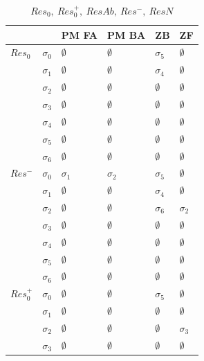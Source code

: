 \documentclass[11pt,a4paper]{article}
\begin{document}
    \begin{table}[]
\centering
\label{my-label}
\caption{$Res_0,~ Res_0^+,~ ResAb,~ Res^-,~ ResN$}
\begin{tabular}{|l|l|l|l|l|l|}
\hline
     &   & PM FA & PM BA & ZB & ZF \\ \hline
$Res_0$ & $\sigma_0$ &  $\emptyset$ & $\emptyset$ & $\sigma_5$ & $\emptyset$   \\ \hline
     & $\sigma_1$ &  $\emptyset$  & $\emptyset$ & $\sigma_4$   &  $\emptyset$  \\ \hline
     & $\sigma_2$ &  $\emptyset$  & $\emptyset$ & $\emptyset$   &  $\emptyset$  \\ \hline
     & $\sigma_3$ &  $\emptyset$  & $\emptyset$ & $\emptyset$   &  $\emptyset$  \\ \hline
     & $\sigma_4$ &  $\emptyset$  & $\emptyset$ & $\emptyset$   &  $\emptyset$  \\ \hline
     & $\sigma_5$ &  $\emptyset$  & $\emptyset$ & $\emptyset$   &  $\emptyset$  \\ \hline
     & $\sigma_6$ &  $\emptyset$  & $\emptyset$ & $\emptyset$   &  $\emptyset$  \\ \hline
$Res^-$ & $\sigma_0$ &  $\sigma_1$ & $\sigma_2$ & $\sigma_5$ & $\emptyset$   \\ \hline
     & $\sigma_1$ &  $\emptyset$  & $\emptyset$ & $\sigma_4$   &  $\emptyset$  \\ \hline
     & $\sigma_2$ &  $\emptyset$  & $\emptyset$ & $\sigma_6$   &  $\sigma_2$  \\ \hline
     & $\sigma_3$ &  $\emptyset$  & $\emptyset$ & $\emptyset$   &  $\emptyset$  \\ \hline
     & $\sigma_4$ &  $\emptyset$  & $\emptyset$ & $\emptyset$   &  $\emptyset$  \\ \hline
     & $\sigma_5$ &  $\emptyset$  & $\emptyset$ & $\emptyset$   &  $\emptyset$  \\ \hline
     & $\sigma_6$ &  $\emptyset$  & $\emptyset$ & $\emptyset$   &  $\emptyset$  \\ \hline
$Res_0^+$ & $\sigma_0$ &  $\emptyset$ & $\emptyset$ & $\sigma_5$ & $\emptyset$   \\ \hline
     & $\sigma_1$ &  $\emptyset$  & $\emptyset$ & $\emptyset$   &  $\emptyset$  \\ \hline
     & $\sigma_2$ &  $\emptyset$  & $\emptyset$ & $\emptyset$   &  $\sigma_3$  \\ \hline
     & $\sigma_3$ &  $\emptyset$  & $\emptyset$ & $\emptyset$   &  $\emptyset$  \\ \hline

\end{tabular}
\end{table}
\end{document}
